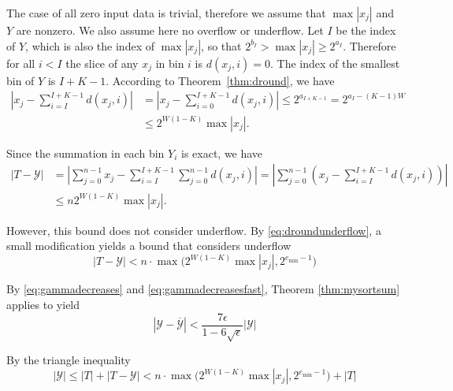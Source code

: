     The case of all zero input data is trivial, therefore we assume that
    $\max|x_j|$ and $Y$ are nonzero.
    We also assume here no overflow or underflow.
    Let $I$ be the index of $Y$, which is also the index of $\max|x_j|$,
    so that $2^{b_I} > \max|x_j| \geq 2^{a_I}$.
    Therefore for all $i < I$ the slice of any $x_j$ in bin $i$ is $d(x_j, i) = 0$.
    The index of the smallest bin of $Y$ is $I + K - 1$.
    According to Theorem~\ref{thm:dround}, we have
    \begin{align*}
        |x_j - \sum_{i=I}^{I + K -1} d(x_j,i)|
            & = |x_j - \sum_{i=0}^{I + K - 1} d(x_j,i)|
            \leq 2^{a_{I + K -1}} 
            = 2^{a_I - (K-1)W} \\
            & \leq 2^{W(1-K)} \max|x_j|. 
    \end{align*}

    Since the summation in each bin $Y_i$ is exact, we have
    \begin{align}
        |T - \mathcal{Y}| & = |\sum_{j=0}^{n-1} x_j - \sum_{i=I}^{I+K-1} \sum_{j=0}^{n-1} d(x_j, i)|
            = |\sum_{j=0}^{n-1} (x_j - \sum_{i=I}^{I+K-1} d(x_j,i))| \nonumber \\
            & \leq n 2^{W(1-K)} \max|x_j|.
            \label{eq:repboundnaive}
    \end{align}

    However, this bound does not consider underflow. By
    \eqref{eq:droundunderflow}, a small modification yields a bound that
    considers underflow
    \begin{equation}
      \label{eq:repbound}
      |T - \mathcal{Y}| < n \cdot \max\bigl(2^{W  (1 - K)} \max|x_j|, 2^{e_{\min} - 1}\bigr)
    \end{equation}

    By  \eqref{eq:gammadecreases} and \eqref{eq:gammadecreasesfast},
    Theorem \ref{thm:mysortsum} applies to yield
    \begin{equation*}
      \left|\mathcal{Y} - \overline{\mathcal{Y}}\right| < \frac{7\epsilon}{1 - 6\sqrt\epsilon}|\mathcal{Y}|
    \end{equation*}

    By the triangle inequality
    \begin{equation*}
      |\mathcal{Y}| \leq |T| + |T - \mathcal{Y}| < n \cdot \max\bigl(2^{W(1-K)}  \max|x_j|, 2^{e_{\min} - 1}\bigr) + |T|
    \end{equation*}

